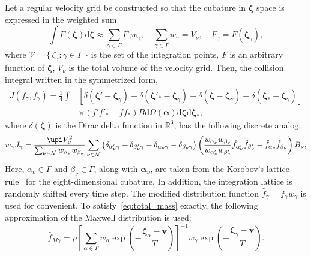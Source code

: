 \documentclass[]{jfm}
\newcommand{\dd}{\mathrm{d}}
\newcommand{\dzeta}{\boldsymbol{\dd\zeta}}
\newcommand{\bzeta}{\boldsymbol{\zeta}}
\newcommand{\Nu}{\mathcal{N}}
\newcommand{\Set}[2]{\{\,{#1}:{#2}\,\}}
\begin{document}
Let a regular velocity grid be constructed so that
the cubature in \(\bzeta\) space is expressed in the weighted sum
\begin{equation}\label{eq:zeta_cubature}
    \int F(\bzeta) \dzeta \approx \sum_{\gamma\in\Gamma} F_\gamma w_\gamma,
        \quad \sum_{\gamma\in\Gamma} w_\gamma = V_\nu,
        \quad F_\gamma = F(\bzeta_\gamma),
\end{equation}
where \(\mathcal{V} = \Set{\zeta_\gamma}{\gamma\in\Gamma}\) is the set of the integration points,
\(F\) is an arbitrary function of \(\bzeta\),
\(V_\nu\) is the total volume of the velocity grid.
Then, the collision integral written in the symmetrized form,
\begin{equation}\label{eq:symm_ci}
    \begin{aligned}
    J(f_\gamma, f_\gamma) = \frac14\int &\left[
        \delta(\bzeta'-\bzeta_\gamma) + \delta(\bzeta'_*-\bzeta_\gamma)
        - \delta(\bzeta-\bzeta_\gamma) - \delta(\bzeta_*-\bzeta_\gamma)\right] \\
        &\times(f'f'_* - ff_*)B \dd\Omega(\boldsymbol{\alpha}) \dzeta\dzeta_*,
    \end{aligned}
\end{equation}
where \(\delta(\bzeta)\) is the Dirac delta function in \(\mathbb{R}^3\),
has the following discrete analog:
\begin{equation}\label{eq:discrete_symm_ci}
    w_\gamma J_\gamma = \frac{\upi V_\nu^2}{\sum_{\nu\in\Nu} w_{\alpha_\nu}w_{\beta_\nu}}
        \sum_{\nu\in\Nu} \left(
            \delta_{\alpha'_\nu\gamma} + \delta_{\beta'_\nu\gamma}
            - \delta_{\alpha_\nu\gamma} - \delta_{\beta_\nu\gamma}
        \right)\left(
            \frac{w_{\alpha_\nu}w_{\beta_\nu}}{w_{\alpha'_\nu}w_{\beta'_\nu}}
            \hat{f}_{\alpha'_\nu}\hat{f}_{\beta'_\nu} - \hat{f}_{\alpha_\nu}\hat{f}_{\beta_\nu}
        \right)B_\nu,
\end{equation}
Here, \(\alpha_\nu\in\Gamma\) and \(\beta_\nu\in\Gamma\), along with \(\boldsymbol{\alpha}_\nu\),
are taken from the Korobov's lattice rule~\citep{Korobov1959, Sloan1994}
for the eight-dimensional cubature.
In addition, the integration lattice is randomly shifted every time step.
The modified distribution function \(\hat{f}_\gamma = f_\gamma w_\gamma\) is used for convenient.
To satisfy~\eqref{eq:total_mass} exactly, the following approximation of the Maxwell distribution is used:
\begin{equation}\label{eq:discrete_Maxwell}
    \hat{f}_{M\gamma} = \rho\left[\sum_{\alpha\in\Gamma}w_\alpha\exp
            \left(-\frac{\bzeta_\alpha - \boldsymbol{v}}{T}\right)
        \right]^{-1}
        w_\gamma\exp\left(-\frac{\bzeta_\gamma - \boldsymbol{v}}{T}\right).
\end{equation}
\end{document}
